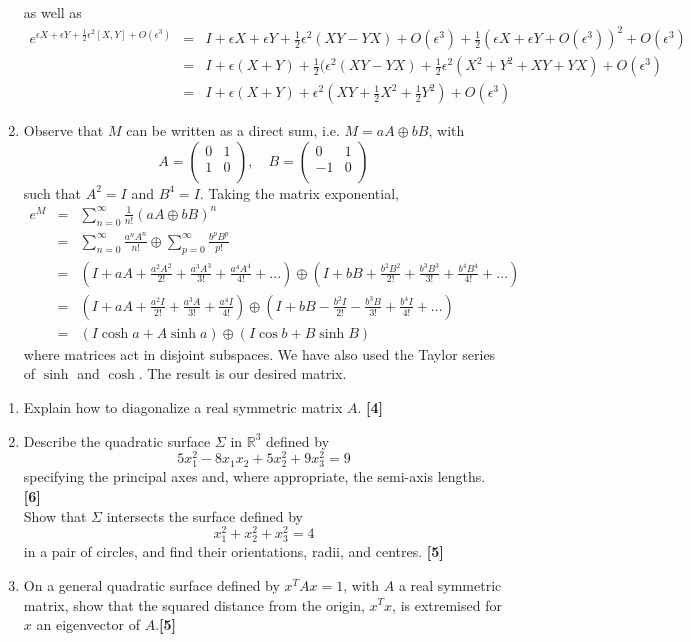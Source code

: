 \documentclass[a4paper]{article}
\begin{document}
\begin{ans}
\begin{enumerate}[label=(\alph*)]
as well as
\begin{eqnarray}
e^{\epsilon X+\epsilon Y+\frac{1}{2}\epsilon^2[X,Y]+O(\epsilon^3)}&=&I+\epsilon X+\epsilon Y+\frac{1}{2}\epsilon^2(XY-YX)+O(\epsilon^3)+\frac{1}{2}(\epsilon X+\epsilon Y+O(\epsilon^3))^2+O(\epsilon^3)\nonumber\\&=&I+\epsilon(X+Y)+\frac{1}{2}(\epsilon^2(XY-YX)+\frac{1}{2}\epsilon^2(X^2+Y^2+XY+YX)+O(\epsilon^3)\nonumber\\&=&I+\epsilon(X+Y)+\epsilon^2(XY+\frac{1}{2}X^2+\frac{1}{2}Y^2)+O(\epsilon^3)\nonumber
\end{eqnarray}
\item Observe that $M$ can be written as a direct sum, i.e. $M=aA\oplus bB$, with
$$A=\begin{pmatrix}0&1\\1&0\\\end{pmatrix},\quad B=\begin{pmatrix}0&1\\-1&0\\\end{pmatrix}$$
such that $A^2=I$ and $B^4=I$. Taking the matrix exponential,
\begin{eqnarray}
e^M&=&\sum_{n=0}^\infty\frac{1}{n!}(aA\oplus bB)^n\nonumber\\&=&\sum_{n=0}^\infty\frac{a^nA^n}{n!}\oplus\sum_{p=0}^\infty\frac{b^pB^p}{p!}\nonumber\\&=& (I+aA+\frac{a^2A^2}{2!}+\frac{a^3A^3}{3!}+\frac{a^4A^4}{4!}+...)\oplus(I+bB+\frac{b^2B^2}{2!}+\frac{b^3B^3}{3!}+\frac{b^4B^4}{4!}+...)\nonumber\\&=&(I+aA+\frac{a^2I}{2!}+\frac{a^3A}{3!}+\frac{a^4I}{4!})\oplus(I+bB-\frac{b^2I}{2!}-\frac{b^3B}{3!}+\frac{b^4I}{4!}+...)\nonumber\\&=&(I\cosh a+ A\sinh a)\oplus(I\cos b+B\sinh B)\nonumber
\end{eqnarray}
where matrices act in disjoint subspaces. We have also used the Taylor series of $\sinh$ and $\cosh$. The result is our desired matrix.
\end{enumerate}
\end{ans}
\newpage
\begin{qns}\leavevmode
\begin{enumerate}[label=(\alph*)]
\item Explain how to diagonalize a real symmetric matrix $A$. \hfill \textbf{[4]}
\item Describe the quadratic surface $\Sigma$ in $\mathbb{R}^3$ defined by
$$5x_1^2-8x_1x_2+5x_2^2+9x_3^2=9$$
specifying the principal axes and, where appropriate, the semi-axis lengths. \hfill \textbf{[6]}\\[5pt]
Show that $\Sigma$ intersects the surface defined by
$$x_1^2+x_2^2+x_3^2=4$$
in a pair of circles, and find their orientations, radii, and centres. \hfill \textbf{[5]}
\item On a general quadratic surface defined by $x^TAx = 1$, with $A$ a real symmetric matrix, show that the squared distance from the origin, $x^Tx$, is extremised for $x$ an eigenvector of $A$.\hfill \textbf{[5]}
\end{enumerate}
\end{qns}
\end{document}
